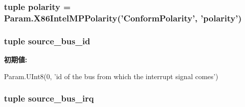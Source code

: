 \label{classIntelMP_1_1X86IntelMPLocalIntAssignment_a47ced18ebb7927f6eede388751a1e331}
\hypertarget{classIntelMP_1_1X86IntelMPLocalIntAssignment_aa4bc0ac88ce7c17dc39f4f675e09fc65}{
\subsubsection[{polarity}]{\setlength{\rightskip}{0pt plus 5cm}tuple {\bf polarity} = Param.X86IntelMPPolarity('ConformPolarity', '{\bf polarity}')}}
\label{classIntelMP_1_1X86IntelMPLocalIntAssignment_aa4bc0ac88ce7c17dc39f4f675e09fc65}
\hypertarget{classIntelMP_1_1X86IntelMPLocalIntAssignment_a6c1f8d95836f7b93621c1a4b51e63fe1}{
\subsubsection[{source\_\-bus\_\-id}]{\setlength{\rightskip}{0pt plus 5cm}tuple {\bf source\_\-bus\_\-id}}}
\label{classIntelMP_1_1X86IntelMPLocalIntAssignment_a6c1f8d95836f7b93621c1a4b51e63fe1}
{\bfseries 初期値:}
\begin{DoxyCode}
Param.UInt8(0,
            'id of the bus from which the interrupt signal comes')
\end{DoxyCode}
\hypertarget{classIntelMP_1_1X86IntelMPLocalIntAssignment_a42c96669425e02ec03b03caa9826d932}{
\subsubsection[{source\_\-bus\_\-irq}]{\setlength{\rightskip}{0pt plus 5cm}tuple {\bf source\_\-bus\_\-irq}}}
